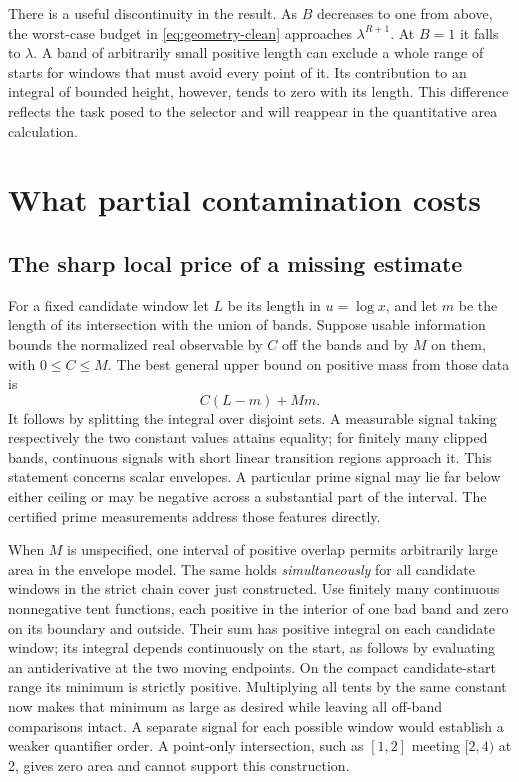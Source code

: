 \documentclass[12pt,letterpaper]{article}
\begin{document}
There is a useful discontinuity in the result. As \(B\) decreases to one from above, the worst-case budget in \eqref{eq:geometry-clean} approaches \(\lambda^{R+1}\). At \(B=1\) it falls to \(\lambda\). A band of arbitrarily small positive length can exclude a whole range of starts for windows that must avoid every point of it. Its contribution to an integral of bounded height, however, tends to zero with its length. This difference reflects the task posed to the selector and will reappear in the quantitative area calculation.

\section{What partial contamination costs}
\subsection{The sharp local price of a missing estimate}
For a fixed candidate window let \(L\) be its length in \(u=\log x\), and let \(m\) be the length of its intersection with the union of bands. Suppose usable information bounds the normalized real observable by \(C\) off the bands and by \(M\) on them, with \(0\le C\le M\). The best general upper bound on positive mass from those data is
\[
                     C(L-m)+Mm.
\]
It follows by splitting the integral over disjoint sets. A measurable signal taking respectively the two constant values attains equality; for finitely many clipped bands, continuous signals with short linear transition regions approach it. This statement concerns scalar envelopes. A particular prime signal may lie far below either ceiling or may be negative across a substantial part of the interval. The certified prime measurements address those features directly.

When \(M\) is unspecified, one interval of positive overlap permits arbitrarily large area in the envelope model. The same holds \emph{simultaneously} for all candidate windows in the strict chain cover just constructed. Use finitely many continuous nonnegative tent functions, each positive in the interior of one bad band and zero on its boundary and outside. Their sum has positive integral on each candidate window; its integral depends continuously on the start, as follows by evaluating an antiderivative at the two moving endpoints. On the compact candidate-start range its minimum is strictly positive. Multiplying all tents by the same constant now makes that minimum as large as desired while leaving all off-band comparisons intact. A separate signal for each possible window would establish a weaker quantifier order. A point-only intersection, such as \([1,2]\) meeting \([2,4)\) at 2, gives zero area and cannot support this construction.
\end{document}
